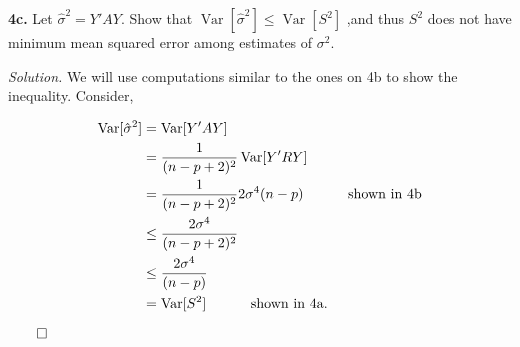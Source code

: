 \documentclass{article}
\newcommand{\Var}{\operatorname{Var}} %
\begin{document}
\newpage
\textbf{4c.} Let \(\hat\sigma^2 = Y'AY\). Show that \(\Var[\hat\sigma^2] \leq \Var[S^2] \) ,and thus \(S^2\) does not have minimum mean squared error among estimates of \(\sigma^2\). 


\vspace{6mm} 
\textit{Solution. } We will use computations similar to the ones on 4b to show the inequality. Consider, 

\begin{align*}
\Var[\hat\sigma^2] &= \Var[Y'AY]  \\
&= \frac1{(n-p+2)^2} \Var[Y'RY] \\
&= \frac1{(n-p+2)^2} 2\sigma^4(n-p)  \hspace{10mm} \text{ shown in 4b} \\
&\leq \frac{2\sigma^4}{(n-p+2)^2}   \\
&\leq   \frac{2\sigma^4}{(n-p)}  \\
&= \Var[S^2]    \hspace{10mm} \text{ shown in 4a. } 
\end{align*}
  \begin{flushright}
\(\qed\)
\end{flushright} 
\end{document}
